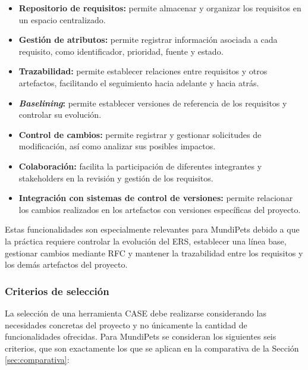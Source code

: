 \documentclass[journal,onecolumn]{IEEEtran}
\begin{document}
	\begin{itemize}[leftmargin=1.4em, itemsep=2pt, topsep=3pt]
		\item \textbf{Repositorio de requisitos:} permite almacenar y organizar los requisitos en un
		espacio centralizado.
		\item \textbf{Gestión de atributos:} permite registrar información asociada a cada requisito,
		como identificador, prioridad, fuente y estado.
		\item \textbf{Trazabilidad:} permite establecer relaciones entre requisitos y otros
		artefactos, facilitando el seguimiento hacia adelante y hacia atrás.
		\item \textbf{\emph{Baselining}:} permite establecer versiones de referencia de los requisitos
		y controlar su evolución.
		\item \textbf{Control de cambios:} permite registrar y gestionar solicitudes de modificación,
		así como analizar sus posibles impactos.
		\item \textbf{Colaboración:} facilita la participación de diferentes integrantes y
		stakeholders en la revisión y gestión de los requisitos.
		\item \textbf{Integración con sistemas de control de versiones:} permite relacionar los
		cambios realizados en los artefactos con versiones específicas del proyecto.
	\end{itemize}
	
	Estas funcionalidades son especialmente relevantes para MundiPets debido a que la práctica requiere
	controlar la evolución del ERS, establecer una línea base, gestionar cambios mediante RFC y
	mantener la trazabilidad entre los requisitos y los demás artefactos del proyecto.
	
	\subsubsection{Criterios de selección}
	
	La selección de una herramienta CASE debe realizarse considerando las necesidades concretas del
	proyecto y no únicamente la cantidad de funcionalidades ofrecidas. Para MundiPets se consideran los
	siguientes seis criterios, que son exactamente los que se aplican en la comparativa de la Sección
	\ref{sec:comparativa}:
	
\end{document}
